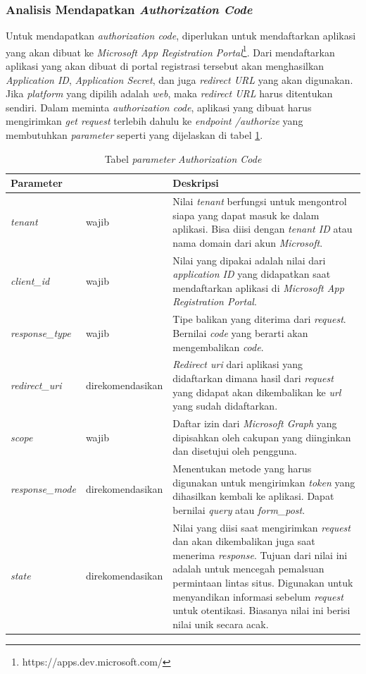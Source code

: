\subsubsection{Analisis Mendapatkan \textit{Authorization Code}}
\label{analisis_authorization_code}
Untuk mendapatkan \textit{authorization code}, diperlukan untuk mendaftarkan aplikasi yang akan dibuat ke \textit{Microsoft App Registration Portal}\footnote{https://apps.dev.microsoft.com/}. Dari mendaftarkan aplikasi yang akan dibuat di portal registrasi tersebut akan menghasilkan \textit{Application ID}, \textit{Application Secret}, dan juga \textit{redirect URL} yang akan digunakan. Jika \textit{platform} yang dipilih adalah \textit{web}, maka \textit{redirect URL} harus ditentukan sendiri. Dalam meminta \textit{authorization code}, aplikasi yang dibuat harus mengirimkan \textit{get request} terlebih dahulu ke \textit{endpoint /authorize} yang membutuhkan \textit{parameter} seperti yang dijelaskan di tabel \ref{tab:parameter_authorization_code}. 

\begin{table}[H]
	\centering 
	\caption{Tabel \textit{parameter} \textit{Authorization Code}}
	\label{tab:parameter_authorization_code}
	\begin{tabular}{|p{3cm}|p{3cm}|p{9cm}|}
	\toprule
	\textbf{Parameter} & & \textbf{Deskripsi}\\ \hline 
	\textit{tenant} & wajib & Nilai \textit{tenant} berfungsi untuk mengontrol siapa yang dapat masuk ke dalam aplikasi. Bisa diisi dengan \textit{tenant ID} atau nama domain dari akun \textit{Microsoft}.\\ \hline 
	\textit{client\_id} & wajib & Nilai yang dipakai adalah nilai dari \textit{application ID} yang didapatkan saat mendaftarkan aplikasi di \textit{Microsoft App Registration Portal}.\\ \hline 
	\textit{response\_type} & wajib & Tipe balikan yang diterima dari \textit{request}. Bernilai 				\textit{code} yang berarti akan mengembalikan \textit{code}. \\ \hline 
	\textit{redirect\_uri} & direkomendasikan & \textit{Redirect uri} dari aplikasi yang didaftarkan dimana hasil dari \textit{request} yang didapat akan dikembalikan ke \textit{url} yang sudah didaftarkan. \\ \hline 
	\textit{scope} & wajib & Daftar izin dari \textit{Microsoft Graph} yang dipisahkan oleh cakupan yang diinginkan dan disetujui oleh pengguna. \\ \hline 
\textit{response\_mode} & direkomendasikan & Menentukan metode yang harus digunakan untuk mengirimkan \textit{token} yang dihasilkan kembali ke aplikasi. Dapat bernilai \textit{query} atau \textit{form\_post}. \\ \hline 
	\textit{state} & direkomendasikan & Nilai yang diisi saat mengirimkan \textit{request} dan akan dikembalikan juga saat menerima \textit{response}. Tujuan dari nilai ini adalah untuk mencegah pemalsuan permintaan lintas situs. Digunakan untuk menyandikan informasi sebelum \textit{request} untuk otentikasi. Biasanya nilai ini berisi nilai unik secara acak. \\ \bottomrule
\end{tabular}  
\end{table}

